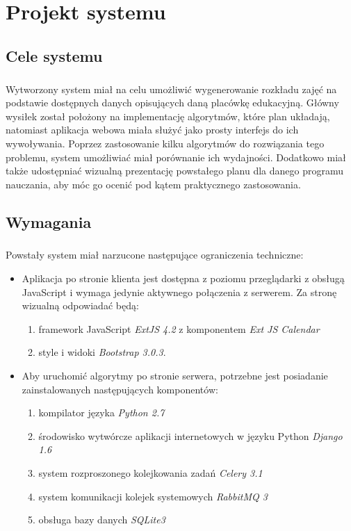 \chapter{Projekt systemu}
\section{Cele systemu}
\paragraph{}Wytworzony system miał na celu umożliwić wygenerowanie rozkładu zajęć na podstawie dostępnych danych opisujących daną placówkę edukacyjną. Główny wysiłek został położony na implementację algorytmów, które plan układają, natomiast aplikacja webowa miała służyć jako prosty interfejs do ich wywoływania. Poprzez zastosowanie kilku algorytmów do rozwiązania tego problemu, system umożliwiać miał porównanie ich wydajności. Dodatkowo miał także udostępniać wizualną prezentację powstałego planu dla danego programu nauczania, aby móc go ocenić pod kątem praktycznego zastosowania.
\section{Wymagania}
\paragraph{}Powstały system miał narzucone następujące ograniczenia techniczne:
\begin{itemize}
\item Aplikacja po stronie klienta jest dostępna z poziomu przeglądarki z obsługą JavaScript i wymaga jedynie aktywnego połączenia z serwerem. Za stronę wizualną odpowiadać będą:
\begin{enumerate}
\item framework JavaScript \emph{ExtJS 4.2} z komponentem \emph{Ext JS Calendar}
\item style i widoki \emph{Bootstrap 3.0.3}.
\end{enumerate}
\item Aby uruchomić algorytmy po stronie serwera, potrzebne jest posiadanie zainstalowanych następujących komponentów:
\begin{enumerate}
\item kompilator języka \emph{Python 2.7}
\item środowisko wytwórcze aplikacji internetowych w języku Python \emph{Django 1.6}
\item system rozproszonego kolejkowania zadań \emph{Celery 3.1}
\item system komunikacji kolejek systemowych \emph{RabbitMQ 3}
\item obsługa bazy danych \emph{SQLite3}
\end{enumerate}
\end{itemize}
